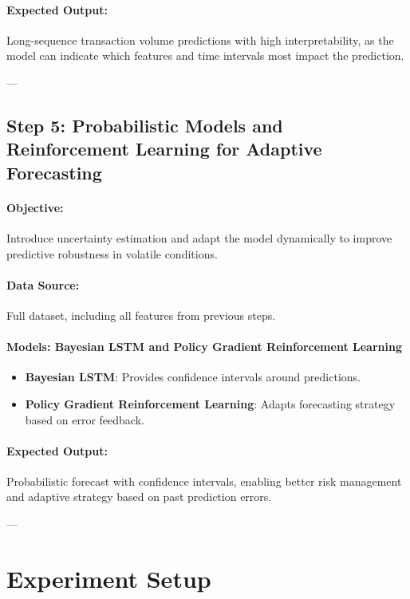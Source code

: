 \documentclass{article}
\begin{document}
\paragraph{Expected Output:} 
Long-sequence transaction volume predictions with high interpretability, as the model can indicate which features and time intervals most impact the prediction.

---

\subsection{Step 5: Probabilistic Models and Reinforcement Learning for Adaptive Forecasting}

\paragraph{Objective:} Introduce uncertainty estimation and adapt the model dynamically to improve predictive robustness in volatile conditions.

\paragraph{Data Source:} Full dataset, including all features from previous steps.

\paragraph{Models: Bayesian LSTM and Policy Gradient Reinforcement Learning}
\begin{itemize}
    \item \textbf{Bayesian LSTM}: Provides confidence intervals around predictions.
    \item \textbf{Policy Gradient Reinforcement Learning}: Adapts forecasting strategy based on error feedback.
\end{itemize}

\paragraph{Expected Output:} Probabilistic forecast with confidence intervals, enabling better risk management and adaptive strategy based on past prediction errors.

---


\section{Experiment Setup}
\end{document}
